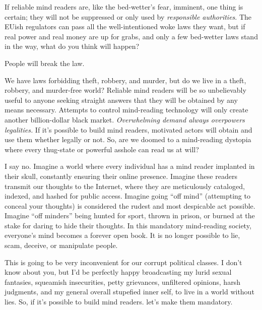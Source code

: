 If reliable mind readers are, like the bed-wetter's fear, imminent, one
thing is certain; they will not be suppressed or only used by
\emph{responsible authorities}. The EUish regulators can pass all the
well-intentioned woke laws they want, but if real power and real money
are up for grabs, and only a few bed-wetter laws stand in the way, what
do you think will happen?

People will break the law.

We have laws forbidding theft, robbery, and murder, but do we live in a
theft, robbery, and murder-free world? Reliable mind readers will be so
unbelievably useful to anyone seeking straight answers that they will be
obtained by any means necessary. Attempts to control mind-reading
technology will only create another billion-dollar black market.
\emph{Overwhelming demand always overpowers legalities.} If it's
possible to build mind readers, motivated actors will obtain and use
them whether legally or not. So, are we doomed to a mind-reading
dystopia where every thug-state or powerful asshole can read us at will?

I say no. Imagine a world where every individual has a mind reader
implanted in their skull, constantly ensuring their online presence.
Imagine these readers transmit our thoughts to the Internet, where they
are meticulously cataloged, indexed, and hashed for public access.
Imagine going ``off mind'' (attempting to conceal your thoughts) is
considered the rudest and most despicable act possible. Imagine ``off
minders'' being hunted for sport, thrown in prison, or burned at the
stake for daring to hide their thoughts. In this mandatory mind-reading
society, everyone's mind becomes a forever open book. It is no longer
possible to lie, scam, deceive, or manipulate people.

This is going to be very inconvenient for our corrupt political classes.
I don't know about you, but I'd be perfectly happy broadcasting my lurid
sexual fantasies, squeamish insecurities, petty grievances, unfiltered
opinions, harsh judgments, and my general overall stupefied inner self,
to live in a world without lies. So, if it's possible to build mind
readers. let's make them mandatory.



%
